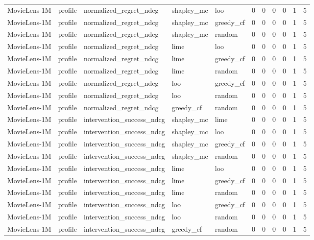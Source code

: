 \begin{table}[t]
{\begin{tabular}{lllllrrrrrr}
MovieLens-1M & profile & normalized\_regret\_ndcg & shapley\_mc & loo & 0 & 0 & 0 & 0 & 1 & 5 \\
MovieLens-1M & profile & normalized\_regret\_ndcg & shapley\_mc & greedy\_cf & 0 & 0 & 0 & 0 & 1 & 5 \\
MovieLens-1M & profile & normalized\_regret\_ndcg & shapley\_mc & random & 0 & 0 & 0 & 0 & 1 & 5 \\
MovieLens-1M & profile & normalized\_regret\_ndcg & lime & loo & 0 & 0 & 0 & 0 & 1 & 5 \\
MovieLens-1M & profile & normalized\_regret\_ndcg & lime & greedy\_cf & 0 & 0 & 0 & 0 & 1 & 5 \\
MovieLens-1M & profile & normalized\_regret\_ndcg & lime & random & 0 & 0 & 0 & 0 & 1 & 5 \\
MovieLens-1M & profile & normalized\_regret\_ndcg & loo & greedy\_cf & 0 & 0 & 0 & 0 & 1 & 5 \\
MovieLens-1M & profile & normalized\_regret\_ndcg & loo & random & 0 & 0 & 0 & 0 & 1 & 5 \\
MovieLens-1M & profile & normalized\_regret\_ndcg & greedy\_cf & random & 0 & 0 & 0 & 0 & 1 & 5 \\
MovieLens-1M & profile & intervention\_success\_ndcg & shapley\_mc & lime & 0 & 0 & 0 & 0 & 1 & 5 \\
MovieLens-1M & profile & intervention\_success\_ndcg & shapley\_mc & loo & 0 & 0 & 0 & 0 & 1 & 5 \\
MovieLens-1M & profile & intervention\_success\_ndcg & shapley\_mc & greedy\_cf & 0 & 0 & 0 & 0 & 1 & 5 \\
MovieLens-1M & profile & intervention\_success\_ndcg & shapley\_mc & random & 0 & 0 & 0 & 0 & 1 & 5 \\
MovieLens-1M & profile & intervention\_success\_ndcg & lime & loo & 0 & 0 & 0 & 0 & 1 & 5 \\
MovieLens-1M & profile & intervention\_success\_ndcg & lime & greedy\_cf & 0 & 0 & 0 & 0 & 1 & 5 \\
MovieLens-1M & profile & intervention\_success\_ndcg & lime & random & 0 & 0 & 0 & 0 & 1 & 5 \\
MovieLens-1M & profile & intervention\_success\_ndcg & loo & greedy\_cf & 0 & 0 & 0 & 0 & 1 & 5 \\
MovieLens-1M & profile & intervention\_success\_ndcg & loo & random & 0 & 0 & 0 & 0 & 1 & 5 \\
MovieLens-1M & profile & intervention\_success\_ndcg & greedy\_cf & random & 0 & 0 & 0 & 0 & 1 & 5 \\
\bottomrule
\end{tabular}
}
\end{table}

